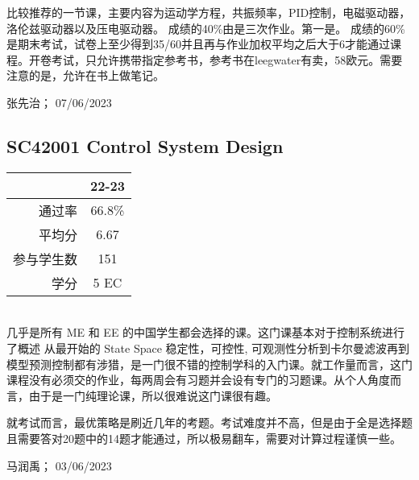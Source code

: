 比较推荐的一节课，主要内容为运动学方程，共振频率，PID控制，电磁驱动器，洛伦兹驱动器以及压电驱动器。
成绩的40\%由是三次作业。第一是。
成绩的60\%是期末考试，试卷上至少得到35/60并且再与作业加权平均之后大于6才能通过课程。开卷考试，只允许携带指定参考书，参考书在leegwater有卖，58欧元。需要注意的是，允许在书上做笔记。

\begin{flushright}
张先治； 07/06/2023
\end{flushright}

\subsection{SC42001 Control System Design}\hypertarget{control}{} 
\begin{minipage}{0.45\textwidth}
\centering
{}
\end{minipage}%
\begin{minipage}{0.45\textwidth}
\raggedleft
\begin{tabular}{r|c}
\textbf{ } & \textbf{22-23} \\ \hline
通过率 & 66.8\% \\ 
平均分 & 6.67 \\ 
参与学生数 & 151 \\ 
学分 & 5 EC\\
\end{tabular}
\end{minipage}\\

几乎是所有 ME 和 EE 的中国学生都会选择的课。这门课基本对于控制系统进行了概述 从最开始的 State Space 稳定性，可控性, 可观测性分析到卡尔曼滤波再到模型预测控制都有涉猎，是一门很不错的控制学科的入门课。就工作量而言，这门课程没有必须交的作业，每两周会有习题并会设有专门的习题课。从个人角度而言，由于是一门纯理论课，所以很难说这门课很有趣。

就考试而言，最优策略是刷近几年的考题。考试难度并不高，但是由于全是选择题且需要答对20题中的14题才能通过，所以极易翻车，需要对计算过程谨慎一些。
\begin{flushright}
马润禹； 03/06/2023
\end{flushright}

